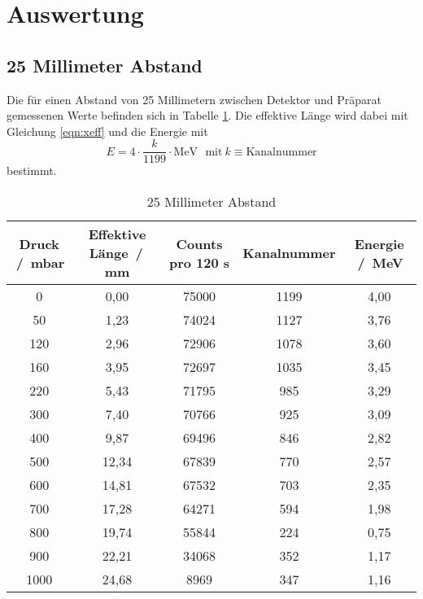 \section{Auswertung}
\label{sec:Auswertung}
\subsection{25 Millimeter Abstand}
Die für einen Abstand von 25 Millimetern zwischen Detektor und Präparat gemessenen Werte befinden sich in Tabelle \ref{tab:25mm}.
Die effektive Länge wird dabei mit Gleichung \ref{eqn:xeff} und die Energie mit
\begin{equation*}
  E = 4 \cdot \frac{k}{1199} \cdot \si{\mega\electronvolt} \: \: \: \text{mit} \: k \equiv \text{Kanalnummer}
\end{equation*}
bestimmt.
\begin{table}
  \centering
  \caption{25 Millimeter Abstand}
  \label{tab:25mm}
  \begin{tabular}{c c c c c}
    \toprule
     Druck \,/\, \si{\milli\bar} & Effektive Länge \,/\, \si{\milli\metre} & Counts pro 120 \si{\second} & Kanalnummer & Energie \,/\, \si{\mega\electronvolt}\\
    \midrule
    0   &  0,00 & 75000 & 1199 & 4,00 \\
    50  &  1,23 & 74024 & 1127 & 3,76 \\
    120 &  2,96 & 72906 & 1078 & 3,60 \\
    160 &  3,95 & 72697 & 1035 & 3,45 \\
    220 &  5,43 & 71795 &  985 & 3,29 \\
    300 &  7,40 & 70766 &  925 & 3,09 \\
    400 &  9,87 & 69496 &  846 & 2,82 \\
    500 & 12,34 & 67839 &  770 & 2,57 \\
    600 & 14,81 & 67532 &  703 & 2,35 \\
    700 & 17,28 & 64271 &  594 & 1,98 \\
    800 & 19,74 & 55844 &  224 & 0,75 \\
    900 & 22,21 & 34068 &  352 & 1,17 \\
    1000& 24,68 & 8969  &  347 & 1,16 \\
    \bottomrule
  \end{tabular}
\end{table}
